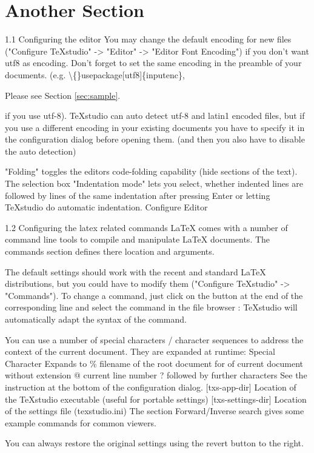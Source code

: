 \documentclass{article}
\begin{document}
	\section{Another Section}
	
	1.1 Configuring the editor
	You may change the default encoding for new files ("Configure TeXstudio" -> "Editor" -> "Editor Font Encoding") if you don't want utf8 as encoding. Don't forget to set the same encoding in the preamble of your documents. (e.g. \textbackslash\{\}usepackage[utf8]\{inputenc\}, 
	
	
	Please see Section \ref{sec:sample}.
	
	if you use utf-8).
	TeXstudio can auto detect utf-8 and latin1 encoded files, but if you use a different encoding in your existing documents you have to specify it in the configuration dialog before opening them. (and then you also have to disable the auto detection)
	
	"Folding" toggles the editors code-folding capability (hide sections of the text).
	The selection box "Indentation mode" lets you select, whether indented lines are followed by lines of the same indentation after pressing Enter or letting TeXstudio do automatic indentation.
	Configure Editor
	
	1.2 Configuring the latex related commands
	LaTeX comes with a number of command line tools to compile and manipulate LaTeX documents. The commands section defines there location and arguments.
	
	The default settings should work with the recent and standard LaTeX distributions, but you could have to modify them ("Configure TeXstudio" -> "Commands"). To change a command, just click on the button at the end of the corresponding line and select the command in the file browser : TeXstudio will automatically adapt the syntax of the command.
	
	You can use a number of special characters / character sequences to address the context of the current document. They are expanded at runtime:
	Special Character	Expands to
	\%	filename of the root document for of current document without extension
	@	current line number
	? followed by further characters	See the instruction at the bottom of the configuration dialog.
	[txs-app-dir]	Location of the TeXstudio executable (useful for portable settings)
	[txs-settings-dir]	Location of the settings file (texstudio.ini)
	The section Forward/Inverse search gives some example commands for common viewers.
	
	You can always restore the original settings using the revert button to the right.
	
\end{document}
